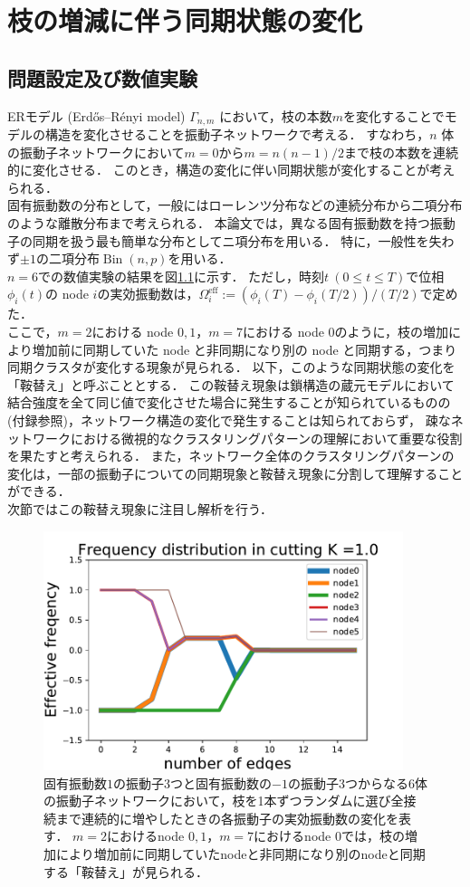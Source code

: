\documentclass[../main]{subfiles}
\begin{document}
\chapter{枝の増減に伴う同期状態の変化}
\label{chap:method-3body}
\section{問題設定及び数値実験}
\label{sec:method-3body-settting}
ERモデル (Erdős–Rényi model) $\Gamma_{n,m}$ において，枝の本数$m$を変化することでモデルの構造を変化させることを振動子ネットワークで考える．
すなわち，$n$ 体の振動子ネットワークにおいて$m=0$から$m=n(n-1)/2$まで枝の本数を連続的に変化させる．
このとき，構造の変化に伴い同期状態が変化することが考えられる．\\
固有振動数の分布として，一般にはローレンツ分布などの連続分布\cite{kuramoto1975}から二項分布のような離散分布\cite{1992BonillaNeuSpigler}まで考えられる．
本論文では，異なる固有振動数を持つ振動子の同期を扱う最も簡単な分布としてニ項分布を用いる．
特に，一般性を失わず$\pm 1$の二項分布$\operatorname{Bin}(n,p)$を用いる．\\
$n=6$での数値実験の結果を図\ref{fig:cutting_N6K1}に示す．
ただし，時刻$t\ (0\leq t\leq T)$で位相$\phi_i(t)$の node $i$の実効振動数は，$\Omega_i^{\mathrm{eff}}:=(\phi_i(T)-\phi_i(T/2))/(T/2)$で定めた．\\
ここで，$m=2$における node $0,1$，$m=7$における node $0$のように，枝の増加により増加前に同期していた node と非同期になり別の node と同期する，つまり同期クラスタが変化する現象が見られる．
以下，このような同期状態の変化を「鞍替え」と呼ぶこととする．
この鞍替え現象は鎖構造の蔵元モデルにおいて結合強度を全て同じ値で変化させた場合に発生することが知られている\cite{XiaHuang:130506}ものの(付録参照)，ネットワーク構造の変化で発生することは知られておらず，
疎なネットワークにおける微視的なクラスタリングパターンの理解において重要な役割を果たすと考えられる．
また，ネットワーク全体のクラスタリングパターンの変化は，一部の振動子についての同期現象と鞍替え現象に分割して理解することができる．\\
次節ではこの鞍替え現象に注目し解析を行う．
\begin{figure}[t]
\centering
\includegraphics[width=105mm]{./images/cutting_N6K1.pdf}
\centering
\caption{固有振動数$1$の振動子3つと固有振動数の$-1$の振動子3つからなる6体の振動子ネットワークにおいて，枝を1本ずつランダムに選び全接続まで連続的に増やしたときの各振動子の実効振動数の変化を表す．
$m=2$におけるnode $0,1$，$m=7$におけるnode $0$では，枝の増加により増加前に同期していたnodeと非同期になり別のnodeと同期する「鞍替え」が見られる．}
\label{fig:cutting_N6K1}
\end{figure}
\end{document}
